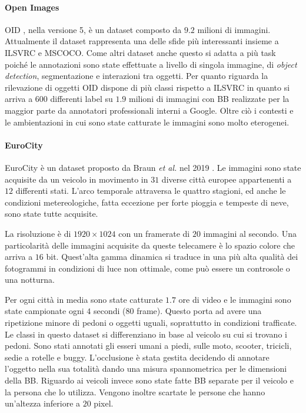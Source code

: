 \paragraph{Open Images} 
\ac{OID} \cite{krasin2017openimages}, nella versione 5, è un dataset composto da $9.2$ milioni di immagini. Attualmente il dataset rappresenta una delle sfide più interessanti insieme a \ac{ILSVRC} e \ac{MSCOCO}. Come altri dataset anche questo si adatta a più task poiché le annotazioni sono state effettuate a livello di singola immagine, di \textit{object detection}, segmentazione e interazioni tra oggetti. 
Per quanto riguarda la rilevazione di oggetti \ac{OID} dispone di più classi rispetto a \ac{ILSVRC} in quanto si arriva a $600$ differenti label su $1.9$ milioni di immagini con \ac{BB} realizzate per la maggior parte da annotatori professionali interni a Google. Oltre ciò i contesti e le ambientazioni in cui sono state catturate le immagini sono molto eterogenei.

\paragraph{EuroCity}  EuroCity è un dataset proposto da Braun \textit{et al. } nel 2019 \cite{braun2018eurocity}. Le immagini sono state acquisite da un veicolo in movimento in $31$ diverse città europee appartenenti a $12$ differenti stati. L'arco temporale attraversa le quattro stagioni, ed anche le condizioni metereologiche, fatta eccezione per forte pioggia e tempeste di neve, sono state tutte acquisite. 

La risoluzione è di $1920 \times 1024$ con un framerate di $20$ immagini al secondo. Una particolarità delle immagini acquisite da queste telecamere è lo spazio colore che arriva a $16$ bit. Quest'alta gamma dinamica si traduce in una più alta qualità dei fotogrammi in condizioni di luce non ottimale, come può essere un controsole o una notturna. 

Per ogni città in media sono state catturate $1.7$ ore di video e le immagini sono state campionate ogni $4$ secondi ($80$ frame). Questo porta ad avere una ripetizione minore di pedoni o oggetti uguali, soprattutto in condizioni trafficate.
Le classi in questo dataset si differenziano in base al veicolo su cui si trovano i pedoni. Sono stati annotati gli esseri umani a piedi, sulle moto, scooter, tricicli, sedie a rotelle e buggy. 
L'occlusione è stata gestita decidendo di annotare l'oggetto nella sua totalità dando una misura spannometrica per le dimensioni della \ac{BB}. 
Riguardo ai veicoli invece sono state fatte \ac{BB} separate per il veicolo e la persona che lo utilizza. Vengono inoltre scartate le persone che hanno un'altezza inferiore a $20$ pixel.

